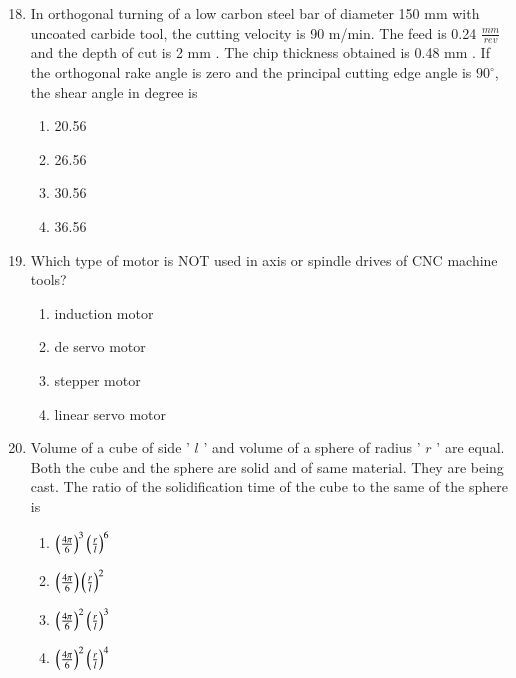 \documentclass[journal]{IEEEtran}
\begin{document}
\begin{enumerate}
		\setcounter{enumi}{17}
       \item In orthogonal turning of a low carbon steel bar of diameter 150 mm with uncoated carbide tool, the cutting velocity is 90 m/min. The feed is 0.24 $\frac{mm}{rev}$ and the depth of cut is 2 mm . The chip thickness obtained is 0.48 mm . If the orthogonal rake angle is zero and the principal cutting edge angle is $90^{\circ}$, the shear angle in degree is
        \begin{multicols}{4}
            \begin{enumerate}
                \item 20.56
                \item 26.56
                \item 30.56
                \item 36.56
            \end{enumerate}
        \end{multicols}


    \item Which type of motor is NOT used in axis or spindle drives of CNC machine tools?


		\begin{multicols}{1}
			\begin{enumerate}
	\item induction motor
    \item de servo motor
    \item stepper motor
    \item linear servo motor
			\end{enumerate}
		\end{multicols}


    \item Volume of a cube of side ' $l$ ' and volume of a sphere of radius ' $r$ ' are equal. Both the cube and the sphere are solid and of same material. They are being cast. The ratio of the solidification time of the cube to the same of the sphere is
        \begin{multicols}{4}
            \begin{enumerate}
              \item $\left(\frac{4 \pi}{6}\right)^{3}\left(\frac{r}{l}\right)^{6}$
              \item $\left(\frac{4 \pi}{6}\right)\left(\frac{r}{l}\right)^{2}$
              \item $\left(\frac{4 \pi}{6}\right)^{2}\left(\frac{r}{l}\right)^{3}$
              \item $\left(\frac{4 \pi}{6}\right)^{2}\left(\frac{r}{l}\right)^{4}$
            \end{enumerate}
        \end{multicols}



\end{enumerate}
\end{document}
